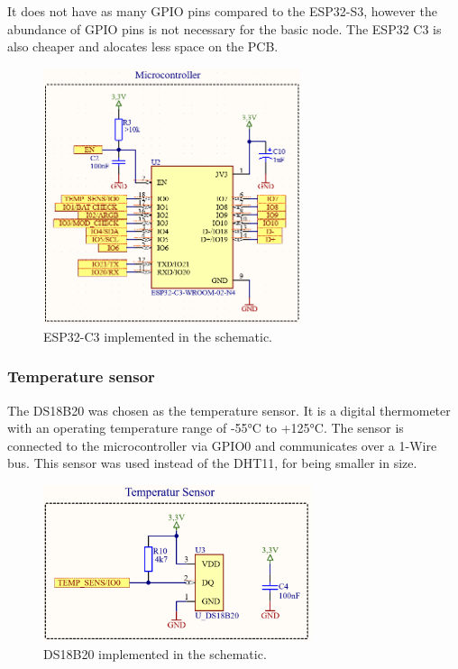         It does not have as many GPIO pins compared to the ESP32-S3, however the abundance
        of GPIO pins is not necessary for the basic node. The ESP32 C3 is also cheaper and 
        alocates less space on the PCB.

        \begin{figure}[H]
            \centering
            \includegraphics[height = 7.5cm]{assets/HW/ESP32-C3-schematic.png}
            \caption{ESP32-C3 implemented in the schematic.}
        \end{figure}


    \subsubsection{Temperature sensor}
        The DS18B20 was chosen as the temperature sensor. It is a digital thermometer
        with an operating temperature range of -55°C to +125°C. The sensor is connected
        to the microcontroller via GPIO0 and communicates over a 1-Wire bus.
        This sensor was used instead of the DHT11, for being smaller in size.

        \begin{figure}[H]
            \centering
            \includegraphics[width=0.7\textwidth]{assets/HW/DS18B20-schematic.png}
            \caption{DS18B20 implemented in the schematic.}
        \end{figure}

